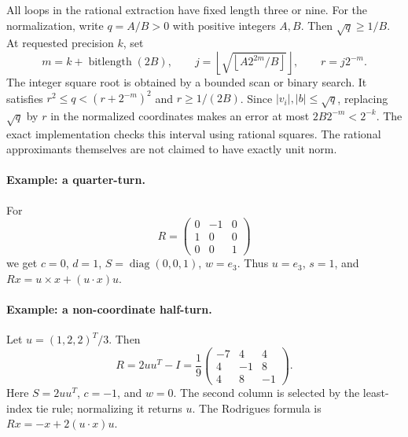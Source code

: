 \documentclass[11pt]{article}
\theoremstyle{definition}\newtheorem{definition}[theorem]{Definition}
\begin{document}
All loops in the rational extraction have fixed length three or nine.
For the normalization, write $q=A/B>0$ with positive integers $A,B$.
Then $\sqrt q\ge1/B$. At requested precision $k$, set
\[
 m=k+\operatorname{bitlength}(2B),\qquad
 j=\left\lfloor\sqrt{\left\lfloor A2^{2m}/B\right\rfloor}\right\rfloor,
 \qquad r=j2^{-m}.
\]
The integer square root is obtained by a bounded scan or binary search.
It satisfies $r^2\le q<(r+2^{-m})^2$ and $r\ge1/(2B)$.
Since $|v_i|,|b|\le\sqrt q$, replacing $\sqrt q$ by $r$ in the
normalized coordinates makes an error at most
$2B2^{-m}<2^{-k}$. The exact implementation checks this interval using
rational squares. The rational approximants themselves are not claimed
to have exactly unit norm.

\paragraph{Example: a quarter-turn.}
For
\[
 R=\begin{pmatrix}0&-1&0\\1&0&0\\0&0&1\end{pmatrix}
\]
we get $c=0$, $d=1$, $S=\operatorname{diag}(0,0,1)$, $w=e_3$.
Thus $u=e_3$, $s=1$, and $Rx=u\times x+(u\cdot x)u$.

\paragraph{Example: a non-coordinate half-turn.}
Let $u=(1,2,2)^T/3$. Then
\[
 R=2uu^T-I=\frac19
 \begin{pmatrix}-7&4&4\\4&-1&8\\4&8&-1\end{pmatrix}.
\]
Here $S=2uu^T$, $c=-1$, and $w=0$. The second column is selected
by the least-index tie rule; normalizing it returns $u$. The Rodrigues
formula is $Rx=-x+2(u\cdot x)u$.
\end{document}
